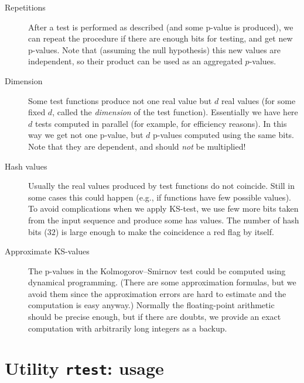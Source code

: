 \documentclass[12pt,a4paper,fullpage]{article}
\begin{document}
\begin{description}

\item[Repetitions] After a test is performed as described (and some p-value is produced), we can repeat the procedure if there are enough bits for testing, and get new p-values. Note that (assuming the null hypothesis) this new values are independent, so their product can be used as an aggregated $p$-values.

\item[Dimension]
Some test functions produce not one real value but $d$ real values (for some fixed $d$, called the \emph{dimension} of the test function). Essentially we have here $d$ tests computed in parallel (for example, for efficiency reasons). In this way we get not one p-value, but $d$ p-values computed using the same bits. Note that they are dependent,  and should \emph{not} be multiplied!

\item[Hash values]
Usually the real values produced by test functions do not coincide. Still in some cases this could happen (e.g., if functions have few possible values). To avoid complications when we apply KS-test, we use few more bits taken from the input sequence and produce some has values. The number of hash bits ($32$) is large enough to make the coincidence a red flag by itself.

\item[Approximate KS-values]
The p-values in the Kolmogorov--Smirnov test could be computed using dynamical programming. (There are some approximation formulas, but we avoid them since the approximation errors are hard to estimate and the computation is easy anyway.) Normally the floating-point arithmetic should be precise enough, but if there are doubts, we provide an exact computation with arbitrarily long integers as a backup.
\end{description}

\section{Utility \texttt{rtest}: usage}
\end{document}

